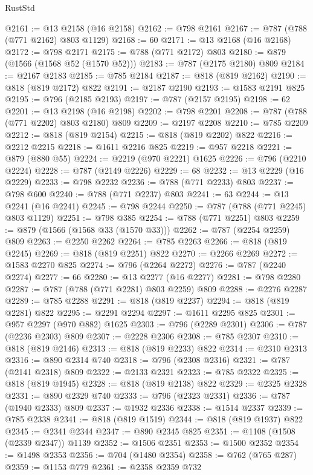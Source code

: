 \begin{lexlean}{RustStd}
\begin{coremodule}
@2161 := @13 @2158 (@16 @2158)
@2162 := @798 @2161
@2167 := @787 (@788 (@771 @2162) @803 @1129)
@2168 := 60
@2171 := @13 @2168 (@16 @2168)
@2172 := @798 @2171
@2175 := @788 (@771 @2172) @803
@2180 := @879 (@1566 (@1568 @52 (@1570 @52)))
@2183 := @787 (@2175 @2180) @809
@2184 := @2167 @2183
@2185 := @785 @2184
@2187 := @818 (@819 @2162)
@2190 := @818 (@819 @2172) @822
@2191 := @2187 @2190
@2193 := @1583 @2191 @825
@2195 := @796 (@2185 @2193)
@2197 := @787 (@2157 @2195)
@2198 := 62
@2201 := @13 @2198 (@16 @2198)
@2202 := @798 @2201
@2208 := @787 (@788 (@771 @2202) @803 @2180) @809
@2209 := @2197 @2208
@2210 := @785 @2209
@2212 := @818 (@819 @2154)
@2215 := @818 (@819 @2202) @822
@2216 := @2212 @2215
@2218 := @1611 @2216 @825
@2219 := @957 @2218
@2221 := @879 (@880 @55)
@2224 := @2219 (@970 @2221) @1625
@2226 := @796 (@2210 @2224)
@2228 := @787 (@2149 @2226)
@2229 := 68
@2232 := @13 @2229 (@16 @2229)
@2233 := @798 @2232
@2236 := @788 (@771 @2233) @803
@2237 := @798 @600
@2240 := @788 (@771 @2237) @803
@2241 := 63
@2244 := @13 @2241 (@16 @2241)
@2245 := @798 @2244
@2250 := @787 (@788 (@771 @2245) @803 @1129)
@2251 := @798 @385
@2254 := @788 (@771 @2251) @803
@2259 := @879 (@1566 (@1568 @33 (@1570 @33)))
@2262 := @787 (@2254 @2259) @809
@2263 := @2250 @2262
@2264 := @785 @2263
@2266 := @818 (@819 @2245)
@2269 := @818 (@819 @2251) @822
@2270 := @2266 @2269
@2272 := @1583 @2270 @825
@2274 := @796 (@2264 @2272)
@2276 := @787 (@2240 @2274)
@2277 := 66
@2280 := @13 @2277 (@16 @2277)
@2281 := @798 @2280
@2287 := @787 (@788 (@771 @2281) @803 @2259) @809
@2288 := @2276 @2287
@2289 := @785 @2288
@2291 := @818 (@819 @2237)
@2294 := @818 (@819 @2281) @822
@2295 := @2291 @2294
@2297 := @1611 @2295 @825
@2301 := @957 @2297 (@970 @882) @1625
@2303 := @796 (@2289 @2301)
@2306 := @787 (@2236 @2303) @809
@2307 := @2228 @2306
@2308 := @785 @2307
@2310 := @818 (@819 @2146)
@2313 := @818 (@819 @2233) @822
@2314 := @2310 @2313
@2316 := @890 @2314 @740
@2318 := @796 (@2308 @2316)
@2321 := @787 (@2141 @2318) @809
@2322 := @2133 @2321
@2323 := @785 @2322
@2325 := @818 (@819 @1945)
@2328 := @818 (@819 @2138) @822
@2329 := @2325 @2328
@2331 := @890 @2329 @740
@2333 := @796 (@2323 @2331)
@2336 := @787 (@1940 @2333) @809
@2337 := @1932 @2336
@2338 := @1514 @2337
@2339 := @785 @2338
@2341 := @818 (@819 @1519)
@2344 := @818 (@819 @1937) @822
@2345 := @2341 @2344
@2347 := @890 @2345 @825
@2351 := @1108 (@1508 (@2339 @2347)) @1139
@2352 := @1506 @2351
@2353 := @1500 @2352
@2354 := @1498 @2353
@2356 := @704 (@1480 @2354)
@2358 := @762 (@765 @287)
@2359 := @1153 @779
@2361 := @2358 @2359 @732

\end{coremodule}
\end{lexlean}
